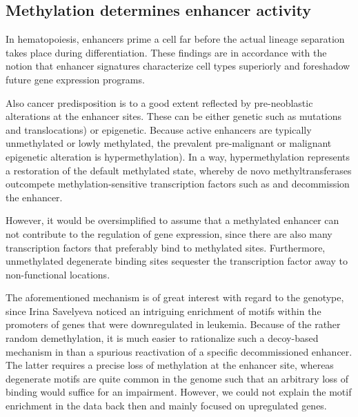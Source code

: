 \subsection{Methylation determines enhancer activity}
\label{chap:d:enhancers:mechanism:dnmtchipgeno:methenh}   

In hematopoiesis, enhancers prime a cell far before the actual lineage separation takes place during differentiation\cite{Paul2015,Drissen2016,Buenrostro2018}. These findings are in accordance with the notion that enhancer signatures characterize cell types superiorly and foreshadow future gene expression programs\cite{Lara-Astiaso2014,Arner2015,Corces2016}. 

Also cancer predisposition is to a good extent reflected by pre-neoblastic alterations at the enhancer sites. These can be either genetic such as mutations\cite{Pomerantz2009,Wasserman2010,Mansour2014,Bahr2018} and translocations\cite{Yamazaki2014,Groeschel2014}) or epigenetic. Because active enhancers are typically unmethylated or lowly methylated\cite{Stadler2011}, the prevalent pre-malignant or malignant epigenetic alteration is hypermethylation\cite{Aran2013,Aran2014,Rasmussen2015,Planello2016}).  In a way, hypermethylation represents a restoration of the default methylated state, whereby de novo methyltransferases outcompete methylation-sensitive transcription factors such as \cite{Domcke2015} and decommission the enhancer.  

However, it would be oversimplified to assume that a methylated enhancer can not contribute to the regulation of gene expression, since there are also many transcription factors that preferably bind to methylated sites\cite{Yin2017a}. Furthermore, unmethylated degenerate binding sites sequester the transcription factor  away to non-functional locations\cite{Kemme2017}.

The aforementioned mechanism is of great interest with regard to the \dnmtchip genotype, since Irina Savelyeva noticed an intriguing enrichment of  motifs within the promoters of genes that were downregulated in \dnmtchip \mllafnine leukemia. Because of the rather random demethylation,  it is much easier to rationalize such a decoy-based mechanism in \dnmtchip than a spurious reactivation of a specific decommissioned enhancer. The latter requires a precise loss of methylation at the enhancer site, whereas degenerate  motifs are quite common in the genome such that an arbitrary loss of   binding would suffice for an impairment. 
However, we could not explain the  motif enrichment in the data back then and mainly focused on upregulated genes.   

